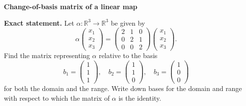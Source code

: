 \begin{problem}[CP-I-0108]
\label{prob:cp-i-0108}
\textbf{Change-of-basis matrix of a linear map}

\textbf{Exact statement.}
\hspace*{1.5em}Let $\alpha:\mathbb R^3\to\mathbb R^3$ be given by
\[
\alpha\begin{pmatrix}x_1\\x_2\\x_3\end{pmatrix}
=
\begin{pmatrix}
	2&1&0\\
	0&2&1\\
	0&0&2
\end{pmatrix}
\begin{pmatrix}x_1\\x_2\\x_3\end{pmatrix}.
\]
Find the matrix representing $\alpha$ relative to the basis
\[
b_1=\begin{pmatrix}1\\1\\1\end{pmatrix},\quad
b_2=\begin{pmatrix}1\\1\\0\end{pmatrix},\quad
b_3=\begin{pmatrix}1\\0\\0\end{pmatrix}
\]
for both the domain and the range.
Write down bases for the domain and range with respect to which the matrix of $\alpha$ is the identity.
\end{problem}

